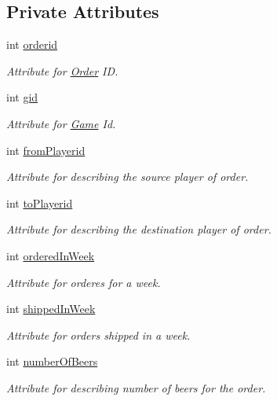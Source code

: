 \subsection*{Private Attributes}
\begin{DoxyCompactItemize}
\item 
int \hyperlink{class_order_a97409bed7105ee7b4cc7304c18badde0}{orderid}
\begin{DoxyCompactList}\small\item\em Attribute for \hyperlink{class_order}{Order} ID. \end{DoxyCompactList}\item 
int \hyperlink{class_order_a56356acb519b814ab01cfac7864935ff}{gid}
\begin{DoxyCompactList}\small\item\em Attribute for \hyperlink{class_game}{Game} Id. \end{DoxyCompactList}\item 
int \hyperlink{class_order_a6920700bdb4e87fb584c1d95c644b9c2}{from\+Playerid}
\begin{DoxyCompactList}\small\item\em Attribute for describing the source player of order. \end{DoxyCompactList}\item 
int \hyperlink{class_order_a0dd2d933c8d7749a9f1d8d40e4424ab7}{to\+Playerid}
\begin{DoxyCompactList}\small\item\em Attribute for describing the destination player of order. \end{DoxyCompactList}\item 
int \hyperlink{class_order_a5918aa6a6d05f6f4c2f3607094d192d7}{ordered\+In\+Week}
\begin{DoxyCompactList}\small\item\em Attribute for orderes for a week. \end{DoxyCompactList}\item 
int \hyperlink{class_order_ab50c4cb2c20c53d4945fd58dc1e7b395}{shipped\+In\+Week}
\begin{DoxyCompactList}\small\item\em Attribute for orders shipped in a week. \end{DoxyCompactList}\item 
int \hyperlink{class_order_ade9d8347595dcdb4494a5a8d7ebc7cbc}{number\+Of\+Beers}
\begin{DoxyCompactList}\small\item\em Attribute for describing number of beers for the order. \end{DoxyCompactList}\end{DoxyCompactItemize}


